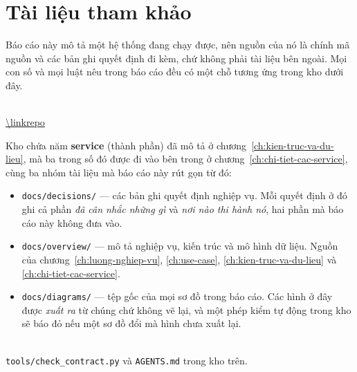\chapter*{Tài liệu tham khảo}
\label{ch:tham-khao}

Báo cáo này mô tả một hệ thống đang chạy được, nên nguồn của nó là chính mã nguồn và các bản ghi
quyết định đi kèm, chứ không phải tài liệu bên ngoài. Mọi con số và mọi luật nêu trong báo cáo
đều có một chỗ tương ứng trong kho dưới đây.

\begin{description}[itemsep=1.1em,parsep=0.35em,leftmargin=0pt]

  \item[Mã nguồn và tài liệu kỹ thuật của dự án]\mbox{}\\
  \url{\linkrepo}
  \medskip

  Kho chứa năm \textbf{service} (thành phần) đã mô tả ở chương~\ref{ch:kien-truc-va-du-lieu}, mà ba
  trong số đó được đi vào bên trong ở chương~\ref{ch:chi-tiet-cac-service}, cùng ba nhóm tài liệu mà
  báo cáo này rút gọn từ đó:

  \begin{itemize}
    \item \texttt{docs/decisions/} --- các bản ghi quyết định nghiệp vụ. Mỗi quyết định ở đó ghi
          cả phần \emph{đã cân nhắc những gì} và \emph{nơi nào thi hành nó}, hai phần mà báo cáo
          này không đưa vào.
    \item \texttt{docs/overview/} --- mô tả nghiệp vụ, kiến trúc và mô hình dữ liệu. Nguồn của
          chương~\ref{ch:luong-nghiep-vu}, \ref{ch:use-case}, \ref{ch:kien-truc-va-du-lieu} và
          \ref{ch:chi-tiet-cac-service}.
    \item \texttt{docs/diagrams/} --- tệp gốc của mọi sơ đồ trong báo cáo. Các hình ở đây được
          \emph{xuất ra} từ chúng chứ không vẽ lại, và một phép kiểm tự động trong kho sẽ báo đỏ
          nếu một sơ đồ đổi mà hình chưa xuất lại.
  \end{itemize}

  \item[Các luật được canh bằng máy]\mbox{}\\
  \texttt{tools/check\_contract.py} và \texttt{AGENTS.md} trong kho trên.
  \medskip

\end{description}
